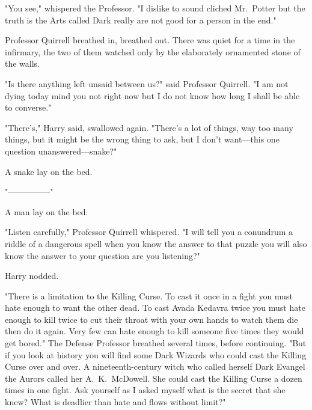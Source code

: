 "You see," whispered the Professor. "I dislike to sound cliched{\el}
Mr.~Potter{\el} but the truth is{\el} the Arts called Dark{\el} really
are not good for a person{\el} in the end."

Professor Quirrell breathed in, breathed out. There was quiet for a time in the
infirmary, the two of them watched only by the elaborately ornamented stone of
the walls.

"Is there anything left{\el} unsaid between us?" said Professor Quirrell. "I
am not dying today{\el} mind you{\el} not right now{\el} but I do not
know how long{\el} I shall be able to converse."

"There's," Harry said, swallowed again. "There's a lot of things, way too many
things, but{\el} it might be the wrong thing to ask, but I don't want—this
one question unanswered—snake?"

A snake lay on the bed.

"—————"

A man lay on the bed.

"Listen carefully," Professor Quirrell whispered. "I will tell you a
conundrum{\el} a riddle of a dangerous spell{\el} when you know the
answer to that puzzle{\el} you will also know{\el} the answer to your
question{\el} are you listening?"

Harry nodded.

"There is a limitation{\el} to the Killing Curse. To cast it once{\el} in
a fight{\el} you must hate enough{\el} to want the other dead. To cast
Avada{\el} Kedavra twice{\el} you must hate enough{\el} to kill
twice{\el} to cut their throat with your own hands{\el} to watch them
die{\el} then do it again. Very few{\el} can hate enough{\el} to kill
someone{\el} five times{\el} they would{\el} get bored." The Defense
Professor breathed several times, before continuing. "But if you look at
history{\el} you will find some Dark Wizards{\el} who could cast the
Killing Curse{\el} over and over. A nineteenth-century witch{\el} who
called herself Dark Evangel{\el} the Aurors called her A.~K.~McDowell. She
could cast the Killing Curse{\el} a dozen times{\el} in one fight. Ask
yourself{\el} as I asked myself{\el} what is the secret{\el} that she
knew? What is deadlier than hate{\el} and flows without limit?"

